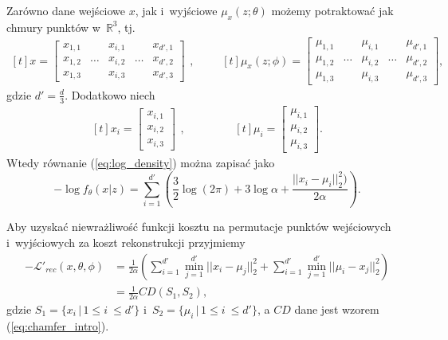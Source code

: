 \documentclass{iithesis}
\begin{document}
Zarówno dane wejściowe $x$, jak i~wyjściowe $\mu_x(z;\theta)$ możemy potraktować
jak chmury punktów w~$\mathbb{R}^3$, tj.
\begin{equation*}
\begin{aligned}[t]
x =
\begin{bmatrix}
x_{1,1} & & x_{i,1} & & x_{d',1} \\
x_{1,2} & \dots & x_{i,2} & \dots & x_{d',2} \\
x_{1,3} & & x_{i,3} & & x_{d',3}
\end{bmatrix}
\end{aligned}
,\qquad
\begin{aligned}[t]
\mu_x(z;\phi) =
\begin{bmatrix}
\mu_{1,1} & & \mu_{i,1} & & \mu_{d',1} \\
\mu_{1,2} & \dots & \mu_{i,2} & \dots & \mu_{d',2} \\
\mu_{1,3} & & \mu_{i,3} & & \mu_{d',3}
\end{bmatrix}
,
\end{aligned}
\end{equation*}
gdzie $d'=\frac{d}{3}$. Dodatkowo niech
\begin{equation*}
\begin{aligned}[t]
x_i =
\begin{bmatrix}
x_{i,1} \\
x_{i,2} \\
x_{i,3}
\end{bmatrix}
\end{aligned}
,\qquad \qquad
\begin{aligned}[t]
\mu_i =
\begin{bmatrix}
\mu_{i,1} \\
\mu_{i,2} \\
\mu_{i,3}
\end{bmatrix}
.
\end{aligned}
\end{equation*}
Wtedy równanie (\ref{eq:log_density}) można zapisać jako
\begin{equation} \label{eq:modified_log_density}
-\log f_\theta(x|z)=\sum_{i=1}^{d'} \left( \frac{3}{2}\log(2\pi) + 3\log \alpha
+\frac{||x_i-\mu_i||_2^2)}{2\alpha} \right).
\end{equation}

Aby uzyskać niewrażliwość funkcji kosztu na permutacje punktów wejściowych i~wyjściowych
za koszt rekonstrukcji przyjmiemy
\begin{equation} \label{eq:final_rec_loss}
\begin{split}
-\mathcal{L'}_{rec}(x,\theta,\phi) &= \frac{1}{2\alpha} \left( \sum_{i=1}^{d'} \min_{j=1}^{d'} ||x_i-\mu_j||^2_2
+ \sum_{i=1}^{d'} \min_{j=1}^{d'} ||\mu_i-x_j||^2_2 \right) \\
&= \frac{1}{2\alpha} CD(S_1,S_2),
\end{split}
\end{equation}
gdzie $S_1 = \{x_i \,|\, 1 \leq i~\leq d'\}$ i~$S_2 = \{\mu_i \,|\, 1 \leq i~\leq d'\}$,
a $CD$ dane jest wzorem (\ref{eq:chamfer_intro}).
\end{document}
